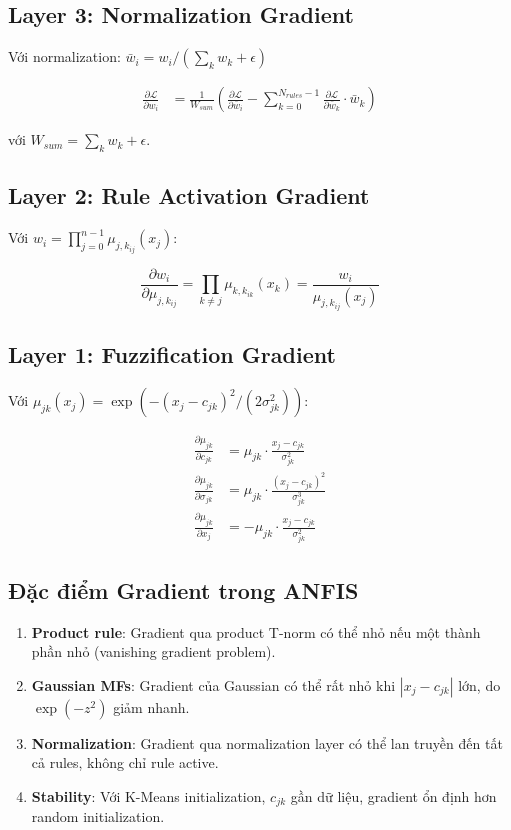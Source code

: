 \documentclass[12pt,a4paper]{article}
\begin{document}
\subsection{Layer 3: Normalization Gradient}

Với normalization: $\bar{w}_i = w_i / (\sum_k w_k + \epsilon)$

\begin{align}
\frac{\partial \mathcal{L}}{\partial w_i} &= \frac{1}{W_{sum}} \left( \frac{\partial \mathcal{L}}{\partial \bar{w}_i} - \sum_{k=0}^{N_{rules}-1} \frac{\partial \mathcal{L}}{\partial \bar{w}_k} \cdot \bar{w}_k \right)
\end{align}

với $W_{sum} = \sum_k w_k + \epsilon$.

\subsection{Layer 2: Rule Activation Gradient}

Với $w_i = \prod_{j=0}^{n-1} \mu_{j,k_{ij}}(x_j)$:

\begin{equation}
\frac{\partial w_i}{\partial \mu_{j,k_{ij}}} = \prod_{k \neq j} \mu_{k,k_{ik}}(x_k) = \frac{w_i}{\mu_{j,k_{ij}}(x_j)}
\end{equation}

\subsection{Layer 1: Fuzzification Gradient}

Với $\mu_{jk}(x_j) = \exp(-(x_j - c_{jk})^2 / (2\sigma_{jk}^2))$:

\begin{align}
\frac{\partial \mu_{jk}}{\partial c_{jk}} &= \mu_{jk} \cdot \frac{x_j - c_{jk}}{\sigma_{jk}^2} \\
\frac{\partial \mu_{jk}}{\partial \sigma_{jk}} &= \mu_{jk} \cdot \frac{(x_j - c_{jk})^2}{\sigma_{jk}^3} \\
\frac{\partial \mu_{jk}}{\partial x_j} &= -\mu_{jk} \cdot \frac{x_j - c_{jk}}{\sigma_{jk}^2}
\end{align}

\subsection{Đặc điểm Gradient trong ANFIS}

\begin{enumerate}
    \item \textbf{Product rule}: Gradient qua product T-norm có thể nhỏ nếu một thành phần nhỏ (vanishing gradient problem).
    \item \textbf{Gaussian MFs}: Gradient của Gaussian có thể rất nhỏ khi $|x_j - c_{jk}|$ lớn, do $\exp(-z^2)$ giảm nhanh.
    \item \textbf{Normalization}: Gradient qua normalization layer có thể lan truyền đến tất cả rules, không chỉ rule active.
    \item \textbf{Stability}: Với K-Means initialization, $c_{jk}$ gần dữ liệu, gradient ổn định hơn random initialization.
\end{enumerate}
\end{document}
